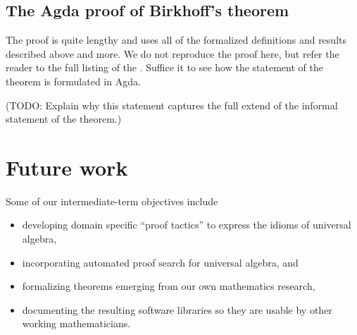 \documentclass[a4paper,USenglish,cleveref,autoref,thm-restate]{lipics-v2019}
\begin{document}
\subsection{The Agda proof of Birkhoff's theorem}\label{sec:the-agda-proof-of-birkhoffs-theorem}
The proof is quite lengthy and uses all of the formalized definitions and results described above and more.  We do not reproduce the proof here, but refer the reader to the full listing of the \birkhoffmodule.  Suffice it to see how the statement of the theorem is formulated in Agda.
\begin{code}\end{code}

(TODO: Explain why this statement captures the full extend of the informal statement of the theorem.)

\section{Future work}
Some of our intermediate-term objectives include
\begin{itemize}
\item developing domain specific ``proof tactics'' to express the idioms of universal algebra,
\item incorporating automated proof search for universal algebra, and
\item formalizing theorems emerging from our own mathematics research,
\item documenting the resulting software libraries so they are usable by other working mathematicians.
\end{itemize}



\end{document}
